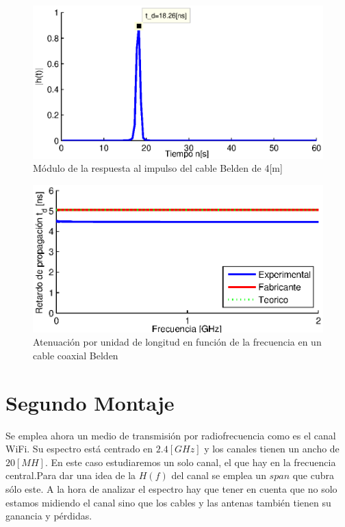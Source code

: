 \documentclass[10pt,conference,a4paper]{IEEEtran}
\begin{document}
\begin{figure}[htb]
    \centering
    \includegraphics[width=\columnwidth]{figuras/respuesta_impulso.eps}
    \caption{Módulo de la respuesta al impulso del cable Belden de 4[m]}
    \label{fig:respuesta_impulso_coaxial}
\end{figure}
\begin{figure}[htb]
    \centering
    \includegraphics[width=\columnwidth]{figuras/retardo.eps}
    \caption{Atenuación por unidad de longitud en función de la frecuencia en un cable coaxial Belden}
    \label{fig:retardo_coaxial}
\end{figure}


\section{Segundo Montaje}

Se emplea ahora un medio de transmisión por radiofrecuencia como es el canal WiFi. Su espectro está centrado en $2.4[GHz]$ y los canales tienen un ancho de $20[MH]$. En este caso estudiaremos un solo canal, el que hay en la frecuencia central.Para dar una idea de la $H(f)$ del canal se emplea un $span$ que cubra sólo este. A la hora de analizar el espectro hay que tener en cuenta que no solo estamos midiendo el canal sino que los cables y las antenas también tienen su ganancia y pérdidas.
 
\end{document}
